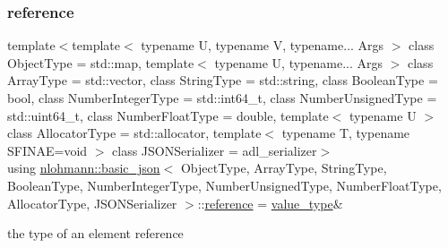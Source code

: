 \subsubsection{\texorpdfstring{reference}{reference}}
{\footnotesize\ttfamily template$<$template$<$ typename U, typename V, typename... Args $>$ class Object\+Type = std\+::map, template$<$ typename U, typename... Args $>$ class Array\+Type = std\+::vector, class String\+Type  = std\+::string, class Boolean\+Type  = bool, class Number\+Integer\+Type  = std\+::int64\+\_\+t, class Number\+Unsigned\+Type  = std\+::uint64\+\_\+t, class Number\+Float\+Type  = double, template$<$ typename U $>$ class Allocator\+Type = std\+::allocator, template$<$ typename T, typename S\+F\+I\+N\+A\+E=void $>$ class J\+S\+O\+N\+Serializer = adl\+\_\+serializer$>$ \\
using \mbox{\hyperlink{classnlohmann_1_1basic__json}{nlohmann\+::basic\+\_\+json}}$<$ Object\+Type, Array\+Type, String\+Type, Boolean\+Type, Number\+Integer\+Type, Number\+Unsigned\+Type, Number\+Float\+Type, Allocator\+Type, J\+S\+O\+N\+Serializer $>$\+::\mbox{\hyperlink{classnlohmann_1_1basic__json_ac6a5eddd156c776ac75ff54cfe54a5bc}{reference}} =  \mbox{\hyperlink{classnlohmann_1_1basic__json_a2b3297873b70c080837e8eedc4fec32f}{value\+\_\+type}}\&}



the type of an element reference 

\mbox{\label{classnlohmann_1_1basic__json_ac223d5560c2b05a208c88de67376c5f2}} 
